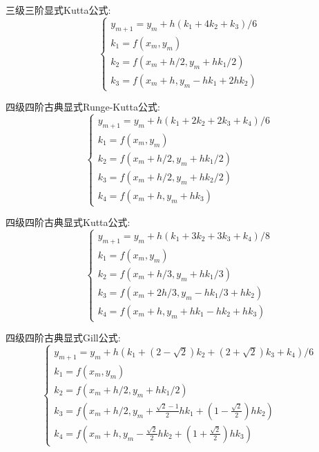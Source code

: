 三级三阶显式Kutta公式:
\begin{equation*}\label{eq:Kutta_3}
		\begin{cases}
				y_{m+1}=y_m + h(k_1+4k_2+k_3)/6\\
				k_1=f(x_m,y_m)\\
				k_2=f(x_m+h/2,y_m+hk_1/2)\\
				k_3=f(x_m+h,y_m-hk_1+2hk_2)
		\end{cases}
\end{equation*}

四级四阶古典显式Runge-Kutta公式:
\begin{equation*}\label{eq:Runge-Kutta_3}
		\begin{cases}
				y_{m+1}=y_m + h(k_1+2k_2+2k_3+k_4)/6\\
				k_1=f(x_m,y_m)\\
				k_2=f(x_m+h/2,y_m+hk_1/2)\\
				k_3=f(x_m+h/2,y_m+hk_2/2)\\
                                k_4=f(x_m+h,y_m+hk_3)
		\end{cases}
\end{equation*}

四级四阶古典显式Kutta公式:
\begin{equation*}\label{eq:Kutta_4}
		\begin{cases}
				y_{m+1}=y_m + h(k_1+3k_2+3k_3+k_4)/8\\
				k_1=f(x_m,y_m)\\
				k_2=f(x_m+h/3,y_m+hk_1/3)\\
				k_3=f(x_m+2h/3,y_m-hk_1/3+hk_2)\\
                                k_4=f(x_m+h,y_m+hk_1-hk_2+hk_3)
		\end{cases}
\end{equation*}

四级四阶古典显式Gill公式:
\begin{equation*}\label{eq:Gill_4}
		\begin{cases}
				y_{m+1}=y_m + h(k_1+(2-\sqrt{2})k_2+(2+\sqrt{2})k_3+k_4)/6\\
				k_1=f(x_m,y_m)\\
				k_2=f(x_m+h/2,y_m+hk_1/2)\\
				k_3=f(x_m+h/2,y_m+\frac{\sqrt{2}-1}{2}hk_1+(1-\frac{\sqrt{2}}{2})hk_2)\\
                                k_4=f(x_m+h,y_m-\frac{\sqrt{2}}{2}hk_2+(1+\frac{\sqrt{2}}{2})hk_3)
		\end{cases}
\end{equation*}

